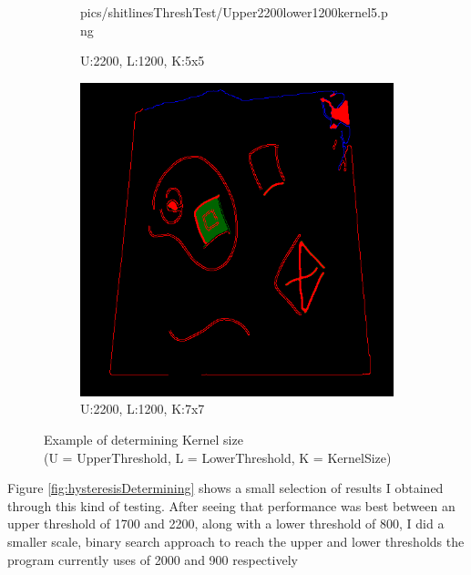 \documentclass[11pt]{article}
\begin{document}
\begin{figure}[!h]
\begin{subfigure}[t]{.25\textwidth}
		{pics/shitlinesThreshTest/Upper2200lower1200kernel5.png}
		\caption{U:2200, L:1200, K:5x5}
	\end{subfigure}
\hfill
	\begin{subfigure}[t]{.25\textwidth}
		\centering
		\includegraphics[scale=0.3]
		{pics/shitlinesThreshTest/Upper2200lower1200kernel7.png}
		\caption{U:2200, L:1200, K:7x7}
	\end{subfigure}
	
	\caption{Example of determining Kernel size \\
		(U = UpperThreshold, L = LowerThreshold, K = KernelSize)}
	\label{fig:kernelDetermining}
\end{figure}


Figure \ref{fig:hysteresisDetermining} shows a
small selection of results I obtained through this kind of testing. After
seeing that performance was best between an upper threshold of 1700 and 2200,
along with a lower threshold of 800, I did a smaller scale, binary search
approach to reach the upper and lower thresholds the program currently uses
of 2000 and 900 respectively
\end{document}
